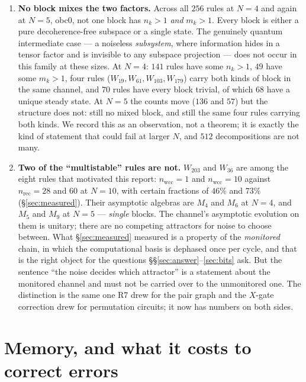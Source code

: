 \documentclass[11pt]{article}
\theoremstyle{plain}
\theoremstyle{definition}
\theoremstyle{remark}
\begin{document}
\begin{enumerate}
\item \textbf{No block mixes the two factors.} Across all $256$ rules at $N=4$
and again at $N=5$, obc0, not one block has $n_k > 1$ \emph{and} $m_k > 1$.
Every block is either a pure decoherence-free subspace or a single state. The
genuinely quantum intermediate case --- a noiseless \emph{subsystem}, where
information hides in a tensor factor and is invisible to any subspace
projection --- does not occur in this family at these sizes. At $N=4$: $141$
rules have some $n_k > 1$, $49$ have some $m_k > 1$, four rules
($W_{19}, W_{61}, W_{103}, W_{179}$) carry both kinds of block in the same
channel, and $70$ rules have every block trivial, of which $68$ have a unique
steady state. At $N=5$ the counts move ($136$ and $57$) but the structure does
not: still no mixed block, and still the same four rules carrying both kinds.
We record this as an observation, not a theorem; it is exactly the kind of
statement that could fail at larger $N$, and $512$ decompositions are not many.

\item \textbf{Two of the ``multistable'' rules are not.} $W_{203}$ and $W_{36}$
are among the eight rules that motivated this report: $n_{\mathrm{wcc}} = 1$ and
$n_{\mathrm{wcc}} = 10$ against $n_{\mathrm{rec}} = 28$ and $60$ at $N = 10$,
with certain fractions of $46\%$ and $73\%$ (\S\ref{sec:measured}). Their
asymptotic algebras are $M_4$ and $M_6$ at $N=4$, and $M_5$ and $M_9$ at $N=5$
--- \emph{single} blocks. The channel's asymptotic evolution on them is
unitary; there are no competing attractors for noise to choose between. What
\S\ref{sec:measured} measured is a property of the \emph{monitored} chain, in
which the computational basis is dephased once per cycle, and that is the right
object for the questions \S\S\ref{sec:answer}--\ref{sec:bits} ask. But the
sentence ``the noise decides which attractor'' is a statement about the
monitored channel and must not be carried over to the unmonitored one. The
distinction is the same one R7 drew for the pair graph and the $X$-gate
correction drew for permutation circuits; it now has numbers on both sides.
\end{enumerate}

\section{Memory, and what it costs to correct errors}
\label{sec:qec}
\end{document}
